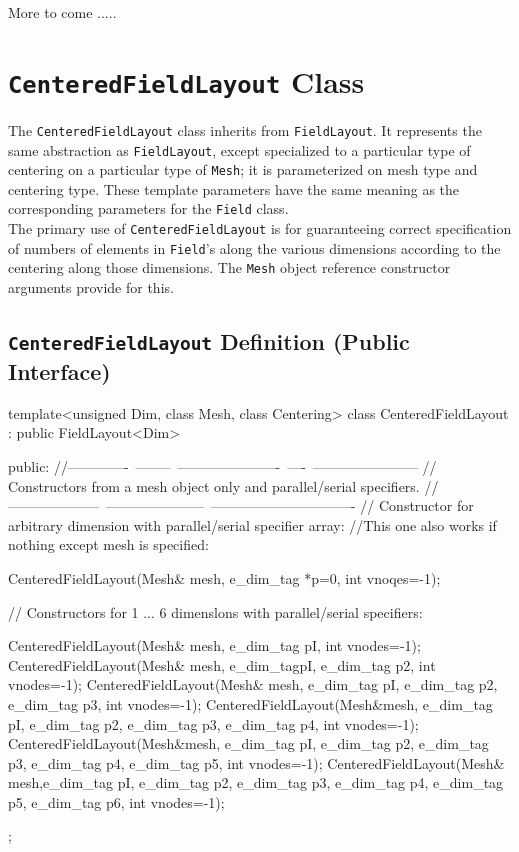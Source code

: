 More to come ..... 



\chapter{\texttt{CenteredFieldLayout} Class}
\label{sec:flcent}
The \texttt{CenteredFieldLayout} class inherits from \texttt{FieldLayout}. It represents the same abstraction as \texttt{FieldLayout}, except specialized to a particular type of 
centering on a particular type of  \texttt{Mesh}; it is parameterized on mesh type and centering type. 
These template parameters have the same meaning as the corresponding parameters for the \texttt{Field} class. \\
The primary use of  \texttt{CenteredFieldLayout} is for guaranteeing correct specification of numbers of elements in 
\texttt{Field}'s along the various dimensions according to the centering along those dimensions. The \texttt{Mesh} object reference constructor arguments provide for this. 
\section{\texttt{CenteredFieldLayout} Definition (Public Interface)}
\begin{smallcode}
template<unsigned Dim, class Mesh, class Centering> 
class CenteredFieldLayout : public FieldLayout<Dim> { 
public: 
//-------------~--------~----------------------~----~----------------------- 
// Constructors from a mesh object only and parallel/serial specifiers. 
//--------------------~---------------------~------------------------------- 
// Constructor for arbitrary dimension with parallel/serial specifier array: 
//This one also works if nothing except mesh is specified: 

CenteredFieldLayout(Mesh& mesh, e_dim_tag *p=0, int vnoqes=-1);
 
// Constructors for 1 ... 6 dimenslons with parallel/serial specifiers: 
 
CenteredFieldLayout(Mesh& mesh, e_dim_tag pI, int vnodes=-1); 
CenteredFieldLayout(Mesh& mesh, e_dim_tagpI, e_dim_tag p2, int vnodes=-1);
CenteredFieldLayout(Mesh& mesh, e_dim_tag pI, e_dim_tag p2, e_dim_tag p3, int vnodes=-1); 
CenteredFieldLayout(Mesh&mesh, e_dim_tag pI, e_dim_tag p2, e_dim_tag p3, 
e_dim_tag p4, int vnodes=-1);
CenteredFieldLayout(Mesh&mesh, e_dim_tag pI, e_dim_tag p2, e_dim_tag p3, 
e_dim_tag p4, e_dim_tag p5, int vnodes=-1);
CenteredFieldLayout(Mesh& mesh,e_dim_tag pI, e_dim_tag p2, e_dim_tag p3, 
e_dim_tag p4, e_dim_tag p5, e_dim_tag p6, int vnodes=-1); 
};
\end{smallcode}
